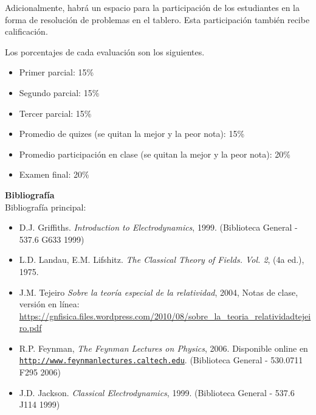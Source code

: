 \documentclass[letterpaper,10pt,onecolumn]{article}
\begin{document}
Adicionalmente, habr\'a un espacio para la participaci\'on de
los estudiantes en la forma de resoluci\'on de problemas en el
tablero. Esta participaci\'on tambi\'en recibe calificaci\'on.

Los porcentajes de cada evaluaci\'on son los siguientes.
\begin{itemize}
\item Primer parcial: 15\%
\item Segundo parcial: 15\%
\item Tercer parcial: 15\%
\item Promedio de quizes (se quitan la mejor y la peor nota): 15\%
\item Promedio participaci\'on en clase (se quitan la mejor y la peor
  nota): 20\% 
\item Examen final: 20\%
\end{itemize}






\noindent\textbf{\large {} \quad
  Bibliograf\'ia}\\[-0.2cm] 


\noindent\normalsize Bibliograf\'ia principal:

\begin{itemize}
	\item D.J. Griffiths. \textit{Introduction to
          Electrodynamics}, 1999. (Biblioteca General - 537.6 G633
          1999) 
        \item L.D. Landau, E.M. Lifshitz. \textit{The Classical
          Theory of Fields. Vol. 2}, (4a ed.), 1975.
        \item J.M. Tejeiro \textit{Sobre la teor\'ia especial de la
          relatividad}, 2004, Notas de clase, versi\'on en l\'inea:
          \url{https://gnfisica.files.wordpress.com/2010/08/sobre_la_teoria_relatividadtejeiro.pdf} 
	\item R.P. Feynman, \textit{The Feynman Lectures on Physics},
          2006. Disponible online en
          \href{http://www.feynmanlectures.caltech.edu}{\nolinkurl{http://www.feynmanlectures.caltech.edu}}. (Biblioteca
          General - 530.0711 F295 2006)\\[-0.6cm] 
	\item J.D. Jackson. \textit{Classical Electrodynamics},
          1999. (Biblioteca General - 537.6 J114 1999)\\[-0.6cm] 
\end{itemize}
\end{document}
